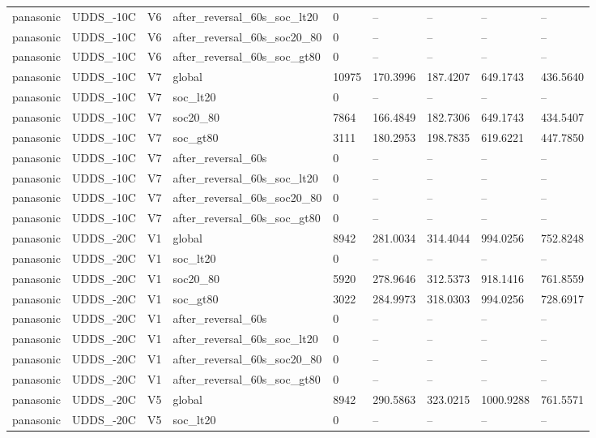 \begin{tabular}{lllllllll}
panasonic & UDDS\_-10C & V6 & after\_reversal\_60s\_soc\_lt20 & 0 & -- & -- & -- & -- \\
panasonic & UDDS\_-10C & V6 & after\_reversal\_60s\_soc20\_80 & 0 & -- & -- & -- & -- \\
panasonic & UDDS\_-10C & V6 & after\_reversal\_60s\_soc\_gt80 & 0 & -- & -- & -- & -- \\
panasonic & UDDS\_-10C & V7 & global & 10975 & 170.3996 & 187.4207 & 649.1743 & 436.5640 \\
panasonic & UDDS\_-10C & V7 & soc\_lt20 & 0 & -- & -- & -- & -- \\
panasonic & UDDS\_-10C & V7 & soc20\_80 & 7864 & 166.4849 & 182.7306 & 649.1743 & 434.5407 \\
panasonic & UDDS\_-10C & V7 & soc\_gt80 & 3111 & 180.2953 & 198.7835 & 619.6221 & 447.7850 \\
panasonic & UDDS\_-10C & V7 & after\_reversal\_60s & 0 & -- & -- & -- & -- \\
panasonic & UDDS\_-10C & V7 & after\_reversal\_60s\_soc\_lt20 & 0 & -- & -- & -- & -- \\
panasonic & UDDS\_-10C & V7 & after\_reversal\_60s\_soc20\_80 & 0 & -- & -- & -- & -- \\
panasonic & UDDS\_-10C & V7 & after\_reversal\_60s\_soc\_gt80 & 0 & -- & -- & -- & -- \\
panasonic & UDDS\_-20C & V1 & global & 8942 & 281.0034 & 314.4044 & 994.0256 & 752.8248 \\
panasonic & UDDS\_-20C & V1 & soc\_lt20 & 0 & -- & -- & -- & -- \\
panasonic & UDDS\_-20C & V1 & soc20\_80 & 5920 & 278.9646 & 312.5373 & 918.1416 & 761.8559 \\
panasonic & UDDS\_-20C & V1 & soc\_gt80 & 3022 & 284.9973 & 318.0303 & 994.0256 & 728.6917 \\
panasonic & UDDS\_-20C & V1 & after\_reversal\_60s & 0 & -- & -- & -- & -- \\
panasonic & UDDS\_-20C & V1 & after\_reversal\_60s\_soc\_lt20 & 0 & -- & -- & -- & -- \\
panasonic & UDDS\_-20C & V1 & after\_reversal\_60s\_soc20\_80 & 0 & -- & -- & -- & -- \\
panasonic & UDDS\_-20C & V1 & after\_reversal\_60s\_soc\_gt80 & 0 & -- & -- & -- & -- \\
panasonic & UDDS\_-20C & V5 & global & 8942 & 290.5863 & 323.0215 & 1000.9288 & 761.5571 \\
panasonic & UDDS\_-20C & V5 & soc\_lt20 & 0 & -- & -- & -- & -- \\

\end{tabular}
